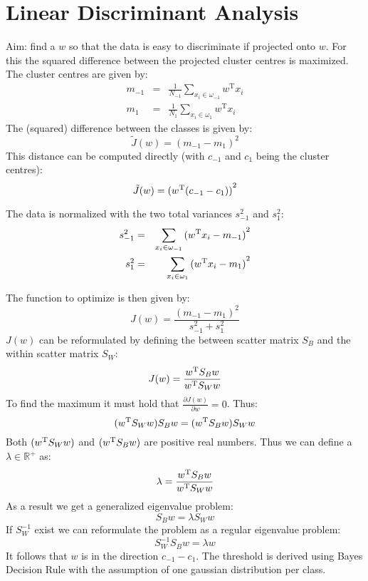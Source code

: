 \section{Linear Discriminant Analysis}
Aim: find a $w$ so that the data is easy to discriminate if projected onto $w$. For this the squared difference between the projected cluster centres is maximized. The cluster centres are given by:
\begin{eqnarray*}
    m_{-1} &=& \frac{1}{N_{-1}} \sum_{x_i \in \omega_{-1}} w^\text{T} x_i \\
    m_{1} &=& \frac{1}{N_{1}} \sum_{x_i \in \omega_{1}} w^\text{T} x_i
\end{eqnarray*}
The (squared) difference between the classes is given by:
\begin{equation*}
    \tilde{J}(w) = {(m_{-1} - m_1)}^2
\end{equation*}
This distance can be computed directly (with $c_{-1}$ and $c_1$ being the cluster centres):
\begin{equation*}
    \tilde{J}(w) = {(w^\text{T} (c_{-1} - c_1))}^2
\end{equation*}

The data is normalized with the two total variances $s_{-1}^2$ and $s_1^2$:
\begin{eqnarray*}
    s_{-1}^2 &=& \sum_{x_i \in \omega_{-1}} {(w^\text{T}x_i - m_{-1})}^2 \\
    s_{1}^2 &=& \sum_{x_i \in \omega_{1}} {(w^\text{T}x_i - m_{1})}^2 \\
\end{eqnarray*}

The function to optimize is then given by:
\begin{equation*}
    J(w) = \frac{{(m_{-1} - m_1)}^2}{s_{-1}^2 + s_1^2}
\end{equation*}
$J(w)$ can be reformulated by defining the between scatter matrix $S_B$ and the within scatter matrix $S_W$:
\begin{equation*}
    J(w) = \frac{w^\text{T} S_B w}{w^\text{T} S_W w}
\end{equation*}
To find the maximum it must hold that $\frac{\partial J(w)}{\partial w} = 0$. Thus:
\begin{equation*}
    (w^\text{T} S_W w) S_B w = (w^\text{T} S_B w) S_W w
\end{equation*}
Both $(w^\text{T} S_W w)$ and $(w^\text{T} S_B w)$ are positive real numbers.
Thus we can define a $\lambda \in \mathbb{R}^+$ as:
\begin{equation*}
    \lambda = \frac{w^\text{T} S_B w}{w^\text{T} S_W w}
\end{equation*}
As a result we get a generalized eigenvalue problem:
\begin{equation*}
    S_B w = \lambda S_W w
\end{equation*}
If $S_W^{-1}$ exist we can reformulate the problem as a regular eigenvalue problem:
\begin{equation*}
    S_W^{-1} S_B w = \lambda w
\end{equation*}
It follows that $w$ is in the direction $c_{-1} - c_1$. The threshold is derived using Bayes Decision Rule with the assumption of one gaussian distribution per class.
